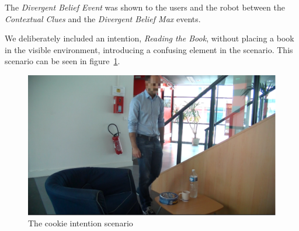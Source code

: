 The \textit{Divergent Belief Event} was shown to the users and the robot between the \textit{Contextual Clues} and the \textit{Divergent Belief Max} events. 

We deliberately included an intention, \textit{Reading the Book}, without placing a book in the visible environment, introducing a confusing element in the scenario. This scenario can be seen in figure~\ref{fig:situation_assessment-cookie}.


 \begin{figure}[ht!]
	\centering
	\includegraphics[scale=0.5]{img/situation_assessment/cookie1-blur.pdf}
	\caption{The cookie intention scenario}
	\label{fig:situation_assessment-cookie}
\end{figure}


